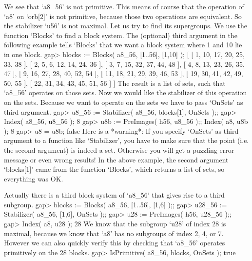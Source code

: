 We see that `a8_56'   is not primitive. This  means  of course   that the
operation  of `a8'  on  `orb[2]'  is not  primitive,  because those   two
operations are equivalent. So the stabilizer `u56' is not maximal. Let us
try to find its supergroups. We use the function `Blocks' to find a block
system. The  (optional) third  argument  in the following   example tells
`Blocks' that we want a block system where 1 and 10 lie in one block.
\beginexample
    gap> blocks := Blocks( a8_56, [1..56], [1,10] );
    [ [ 1, 10, 17, 20, 25, 33, 38 ], [ 2, 5, 6, 12, 14, 24, 36 ], 
      [ 3, 7, 15, 32, 37, 44, 48 ], [ 4, 8, 13, 23, 26, 35, 47 ], 
      [ 9, 16, 27, 28, 40, 52, 54 ], [ 11, 18, 21, 29, 39, 46, 53 ], 
      [ 19, 30, 41, 42, 49, 50, 55 ], [ 22, 31, 34, 43, 45, 51, 56 ] ]
\endexample
The result is a list  of sets, such that  `a8_56' operates on those sets.
Now we would like  the stabilizer of this  operation on the sets. Because
we  want to operate on   the sets we  have  to  pass `OnSets' as  third
argument.
\beginexample
    gap> u8_56 := Stabilizer( a8_56, blocks[1], OnSets );;
    gap> Index( a8_56, u8_56 );
    8
    gap> u8b := PreImages( h56, u8_56 );; Index( a8, u8b );
    8
    gap> u8 = u8b;
    false
\endexample
Here  is a *warning*:   If you specify `OnSets'  as  third argument  to a
function like  `Stabilizer', you have to  make sure that the  point (i.e.
the second argument) is  indeed a set. Otherwise you  will get a puzzling
error message or  even  wrong results! In  the above  example, the second
argument  `blocks[1]'  came from the  function  `Blocks', which returns a
list of sets, so everything was OK.

Actually there  is a third  block system of `a8_56'  that gives rise to a
third subgroup.
\beginexample
    gap> blocks := Blocks( a8_56, [1..56], [1,6] );;
    gap> u28_56 := Stabilizer( a8_56, [1,6], OnSets );;
    gap> u28 := PreImages( h56, u28_56 );;
    gap> Index( a8, u28 );
    28 
\endexample
We know that  the subgroup `u28' of index  28 is maximal, because we know
that  `a8' has no  subgroups  of index 2,  4,  or 7.  However we can also
quickly verify this by checking  that `a8_56' operates primitively on the
28 blocks.
\beginexample
    gap> IsPrimitive( a8_56, blocks, OnSets );
    true 
\endexample

